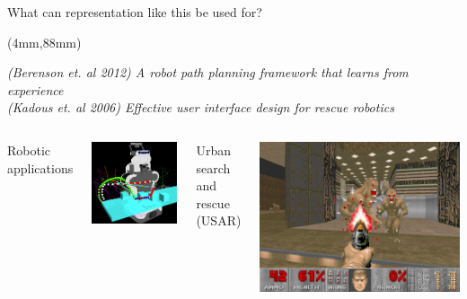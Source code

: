 \documentclass{beamer}
\newenvironment{reference}[2]{%
  \begin{textblock*}{\textwidth}(#1,#2)

      \tiny\it\bgroup\color{red!50!black}}{\egroup\end{textblock*}}
\begin{document}
\begin{frame}{What can representation like this be used for?}
\begin{reference}{4mm}{88mm}
(Berenson et. al 2012) A robot path planning framework that learns from experience \\
(Kadous et. al 2006) Effective user interface design for rescue robotics
\end{reference} 
\begin{columns}
Robotic applications
  \begin{center}
  \includegraphics[width=\textwidth]{m_r.png} 
  \end{center}
Urban search and rescue (USAR)
  \begin{center}
  \includegraphics[width=\textwidth]{m_usar.jpg} 
  \end{center}
\end{columns}
\end{frame}
\end{document}
